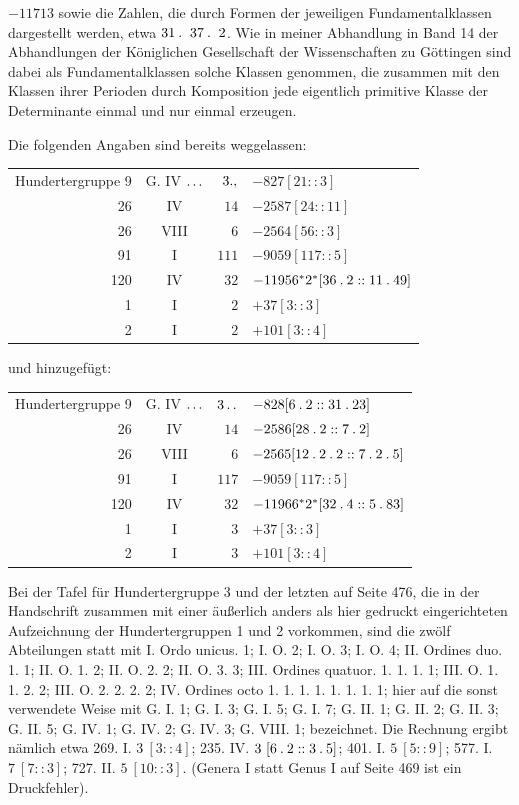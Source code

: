 \begingroup\setlength{\tabcolsep}{5.8pt}$-11713$ sowie die Zahlen, die durch Formen der jeweiligen Fundamentalklassen dargestellt werden, etwa $31\pdot\ 37\pdot\ 2$. Wie in meiner Abhandlung in Band 14 der Abhandlungen der Königlichen Gesellschaft der Wissenschaften zu Göttingen sind dabei als Fundamentalklassen solche Klassen genommen, die zusammen mit den Klassen ihrer Perioden durch Komposition jede eigentlich primitive Klasse der Determinante einmal und nur einmal erzeugen.
\par{}Die folgenden Angaben sind bereits weggelassen:
\begin{longtable}{rcrl}
Hundertergruppe 9 & G. IV $\mathinner{.\,.\,.}$ & $3\mathbin{.},$ & $-827[21::3]$ \\
26 & IV & $14$ & $-2587[24::11]$ \\
26 & VIII & $6$ & $-2564[56::3]$ \\
91 & I & $111$ & $-9059[117::5]$ \\
120 & IV & $32$ & $-11956{}^{*}2^{*}[36\mathbin{.}2::11\mathbin{.}49]$ \\
1 & I & $2$ & $+37[3::3]$ \\
2 & I & $2$ & $+101[3::4]$ \\
\end{longtable}
\par{}und hinzugefügt:
\begin{longtable}{rcrl}
Hundertergruppe 9 & G. IV $\mathinner{.\,.\,.}$ & $3\mathinner{.\,.}$ & $-828[6\mathbin{.}2::31\mathbin{.}23]$ \\
26 & IV & $14$ & $-2586[28\mathbin{.}2::7\mathbin{.}2]$ \\
26 & VIII & $6$ & $-2565[12\mathbin{.}2\mathbin{.}2::7\mathbin{.}2\mathbin{.}5]$ \\
91 & I & $117$ & $-9059[117::5]$ \\
120 & IV & $32$ & $-11966{}^{*}2^{*}[32\mathbin{.}4::5\mathbin{.}83]$ \\
1 & I & $3$ & $+37[3::3]$ \\
2 & I & $3$ & $+101[3::4]$ \\
\end{longtable}
\par Bei der Tafel für Hundertergruppe 3 und der letzten auf Seite 476, die in der Handschrift zusammen mit einer äußerlich anders als hier gedruckt eingerichteten Aufzeichnung der Hundertergruppen 1 und 2 vorkommen, sind die zwölf Abteilungen statt mit I. Ordo unicus. 1; I. O. 2; I. O. 3; I. O. 4; II. Ordines duo. 1. 1; II. O. 1. 2; II. O. 2. 2; II. O. 3. 3; III. Ordines quatuor. 1. 1. 1. 1; III. O. 1. 1. 2. 2; III. O. 2. 2. 2. 2; IV. Ordines octo 1. 1. 1. 1. 1. 1. 1. 1; hier auf die sonst verwendete Weise mit G. I. 1; G. I. 3; G. I. 5; G. I. 7; G. II. 1; G. II. 2; G. II. 3; G. II. 5; G. IV. 1; G. IV. 2; G. IV. 3; G. VIII. 1; bezeichnet. Die Rechnung ergibt nämlich etwa 269. I. $3\ [3::4]$; 235. IV. $3\ [6\mathbin{.}2::3\mathbin{.}5]$; 401. I. $5\ [5::9]$; 577. I. $7\ [7::3]$; 727. II. $5\ [10::3]$. (Genera I statt Genus I auf Seite 469 ist ein Druckfehler).
